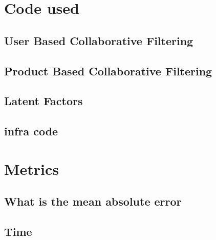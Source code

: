 \section{Code used}
\subsection{User Based Collaborative Filtering}
\subsection{Product Based Collaborative Filtering}
\subsection{Latent Factors}
\subsection{infra code}
\section{Metrics}
\subsection{What is the mean absolute error}
\subsection{Time}
